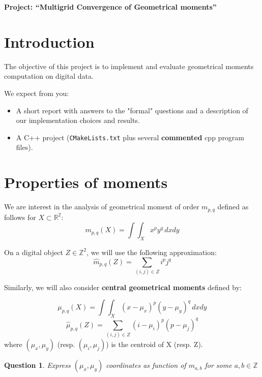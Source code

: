 \documentclass[a4paper, 11pt]{article}
\title{}
\author{}
\date{}
\newtheorem{qu}{Question}
\begin{document}
\begin{center}
	\LARGE \textbf{Project: ``Multigrid Convergence of Geometrical moments''}
\end{center}

\section*{Introduction}

The objective of this project is to implement and evaluate geometrical
moments computation on digital data.


We expect from you:
\begin{itemize}
\item A short report with answers to the "formal" questions and a
  description of our implementation choices and results.
\item A C++ project (\texttt{CMakeLists.txt} plus several
  \textbf{commented} cpp program files).
\end{itemize}


\section{Properties of moments}
We are interest in the analysis of geometrical moment of order
$m_{p,q}$ defined as follows for $X\subset\mathbb{R}^2$:
\begin{displaymath}
 m_{p,q}(X) = \int\int_X x^py^q\,dxdy
\end{displaymath}

On a digital object $Z\in\mathbb{Z}^2$, we will use the following approximation:
\begin{displaymath}
\hat{m}_{p,q}(Z) = \sum_{(i,j)\in Z} i^pj^q
\end{displaymath} 

Similarly, we will also consider {\bf central geometrical moments} defined by:

\begin{displaymath}
 \mu_{p,q}(X) = \int\int_X (x-\mu_x)^p(y-\mu_y)^q\,dxdy
\end{displaymath}
\begin{displaymath}
 \hat{\mu}_{p,q}(Z) =  \sum_{(i,j)\in Z} (i-\mu_i)^p(p-\mu_j)^q
\end{displaymath}
where $(\mu_x,\mu_y)$ (resp. $(\mu_i,\mu_j)$) is the centroid of X (resp. Z).

\begin{qu}
 Express $(\mu_x,\mu_y)$ coordinates as function of $m_{a,b}$ for some $a,b\in\mathbb{Z}$
\end{qu}
\end{document}
